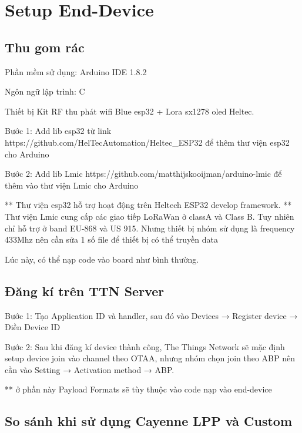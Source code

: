 \section{Setup End-Device}
\subsection{Thu gom rác}
Phần mềm sử dụng: Arduino IDE 1.8.2

Ngôn ngữ lập trình: C

Thiết bị Kit RF thu phát wifi Blue esp32 + Lora sx1278 oled Heltec.

\begin{description}
    \item Bước 1: Add lib esp32 từ link https://github.com/HelTecAutomation/Heltec\_ESP32 để thêm thư viện esp32 cho Arduino
    \item Bước 2: Add lib Lmic https://github.com/matthijskooijman/arduino-lmic để thêm vào thư viện Lmic cho Arduino
\end{description}

** Thư viện esp32 hỗ trợ hoạt động trên Heltech ESP32 develop framework.
** Thư viện Lmic cung cấp các giao tiếp LoRaWan ở classA và Class B. Tuy nhiên chỉ hỗ trợ ở band EU-868 và US 915. Nhưng thiết bị nhóm sử dụng là frequency 433Mhz nên cần sửa 1 số file để thiết bị có thể truyền data

Lúc này, có thể nạp code vào board như bình thường.

\subsection{Đăng kí trên TTN Server}
\begin{description}
    \item Bước 1: Tạo Application ID và handler, sau đó vào Devices → Register device → Điền Device ID  
    \item Bước 2: Sau khi đăng kí device thành công, The Things Network sẽ mặc định setup device join vào channel theo OTAA, nhưng nhóm chọn join theo ABP nên cần vào Setting → Activation method → ABP.
    
\end{description}



** ở phần này Payload Formats sẽ tùy thuộc vào code nạp vào end-device



\subsection{So sánh khi sử dụng Cayenne LPP và Custom}

